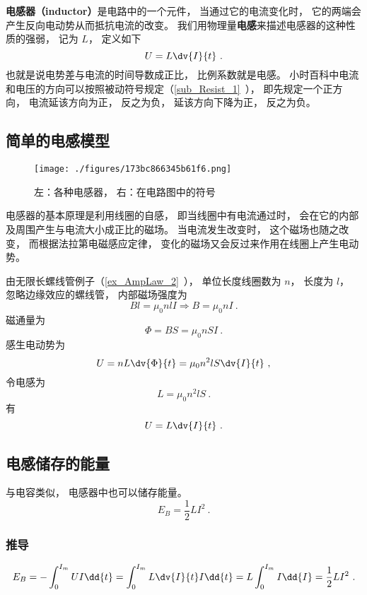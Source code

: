 
\begin{issues}
\issueAbstract
\end{issues}


\textbf{电感器（inductor）}是电路中的一个元件， 当通过它的电流变化时， 它的两端会产生反向电动势从而抵抗电流的改变。 我们用物理量\textbf{电感}来描述电感器的这种性质的强弱， 记为 $L$， 定义如下
\begin{equation}\label{eq_Induct_3}
U = L\dv{I}{t}~.
\end{equation}
也就是说电势差与电流的时间导数成正比， 比例系数就是电感。 小时百科中电流和电压的方向可以按照被动符号规定（\autoref{sub_Resist_1}~）， 即先规定一个正方向， 电流延该方向为正， 反之为负， 延该方向下降为正， 反之为负。

\subsection{简单的电感模型}

\begin{figure}[ht]
\centering
\texttt{[image: ./figures/173bc866345b61f6.png]}
\caption{左：各种电感器， 右：在电路图中的符号} \label{fig_Induct_1}
\end{figure}
电感器的基本原理是利用线圈的自感， 即当线圈中有电流通过时， 会在它的内部及周围产生与电流大小成正比的磁场。 当电流发生改变时， 这个磁场也随之改变， 而根据法拉第电磁感应定律， 变化的磁场又会反过来作用在线圈上产生电动势。

由无限长螺线管例子（\autoref{ex_AmpLaw_2}~）， 单位长度线圈数为 $n$， 长度为 $l$， 忽略边缘效应的螺线管， 内部磁场强度为
\begin{equation}
Bl = \mu_0nlI \Rightarrow B = \mu_0nI~.
\end{equation}
磁通量为
\begin{equation}
\Phi = BS = \mu_0nSI~.
\end{equation}
感生电动势为
\begin{equation}
U = nL\dv{\Phi}{t} = \mu_0n^2lS \dv{I}{t}~,
\end{equation}
令电感为
\begin{equation}\label{eq_Induct_1}
L = \mu_0n^2lS~.
\end{equation}
有
\begin{equation}\label{eq_Induct_2}
U = L\dv{I}{t}~.
\end{equation}

\subsection{电感储存的能量}
与电容类似， 电感器中也可以储存能量。
\begin{equation}
E_B = \frac{1}{2}L I^2~.
\end{equation}

\subsubsection{推导}
\begin{equation}
E_B = -\int_0^{I_m} U I \dd{t} = \int_0^{I_m} L \dv{I}{t} I \dd{t} = L\int_0^{I_m} I \dd{I} = \frac{1}{2} L I^2~.
\end{equation}

